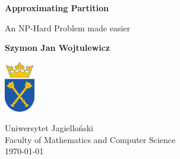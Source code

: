 \begin{titlepage}
    \begin{center}
        \vspace*{1cm}
        
        \Huge
        \textbf{Approximating Partition}
        
        \vspace{0.5cm}
        \LARGE
        An NP-Hard Problem made easier
        
        \vspace{1.5cm}
        
        \small
        \textbf{Szymon Jan Wojtulewicz}
        
        \vfill
        
        
        
        \includegraphics[width=0.1\textwidth]{university_logo.png}
        
        \vspace{0.8cm}
        \Large
        Uniwersytet Jagielloński\\
        Faculty of Mathematics and Computer Science\\
        \today
        
    \end{center}
\end{titlepage}
